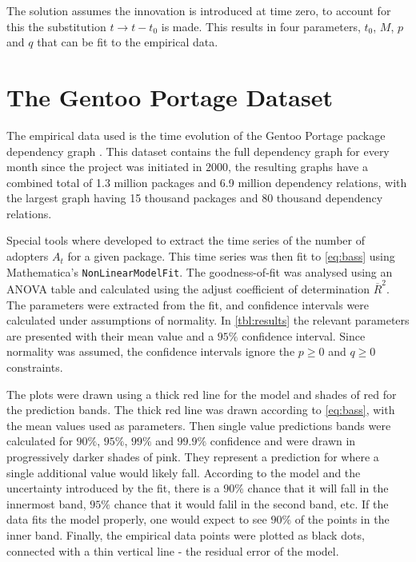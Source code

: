 \documentclass[smallextended,final]{svjour3}
\begin{document}
The solution assumes the innovation is introduced at time zero, to account for this the substitution $t \rightarrow t - t_0$ is made. This results in four parameters, $t_0$, $M$, $p$ and $q$ that can be fit to the empirical data.




\section{The Gentoo Portage Dataset}

The empirical data used is the time evolution of the Gentoo Portage package dependency graph \citep{rem14}. This dataset contains the full dependency graph for every month since the project was initiated in $2000$, the resulting graphs have a combined total of 1.3 million packages and 6.9 million dependency relations, with the largest graph having 15 thousand packages and 80 thousand dependency relations.

Special tools where developed to extract the time series of the number of adopters $A_t$ for a given package. This time series was then fit to \eqref{eq:bass} using Mathematica's \texttt{NonLinearModelFit}. The goodness-of-fit was analysed using an ANOVA table and calculated using the adjust coefficient of determination $\overline{R}^2$. The parameters were extracted from the fit, and confidence intervals were calculated under assumptions of normality. In \ref{tbl:results} the relevant parameters are presented with their mean value and a $95\%$ confidence interval. Since normality was assumed, the confidence intervals ignore the $p \ge 0$ and $q \ge 0$ constraints. 

The plots were drawn using a thick red line for the model and shades of red for the prediction bands. The thick red line was drawn according to \eqref{eq:bass}, with the mean values used as parameters. Then single value predictions bands were calculated for $90\%$, $95\%$, $99\%$ and $99.9\%$ confidence and were drawn in progressively darker shades of pink. They represent a prediction for where a single additional value would likely fall. According to the model and the uncertainty introduced by the fit, there is a $90\%$ chance that it will fall in the innermost band, $95\%$ chance that it would falil in the second band, etc. If the data fits the model properly, one would expect to see $90\%$ of the points in the inner band. Finally, the empirical data points were plotted as black dots, connected with a thin vertical line - the residual error of the model.
\end{document}
